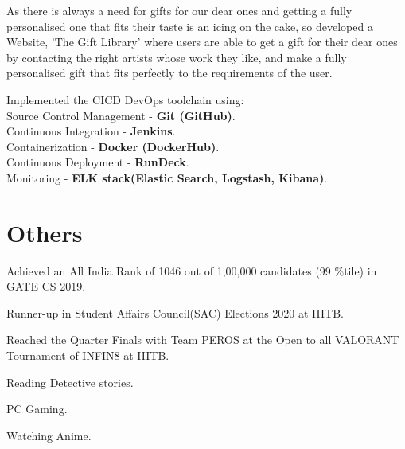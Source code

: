 \documentclass[]{deedy-resume-openfont}
\begin{document}
\begin{minipage}[t]{0.66\textwidth}
\begin{tightemize}
\item As there is always a need for gifts for our dear ones and getting a fully personalised one that fits their taste is an icing on the cake, so developed a Website, 'The Gift Library' where users are able to get a gift for their dear ones by contacting the right artists whose work they like, and make a fully personalised gift that fits perfectly to the requirements of the user.
\item Implemented the CICD DevOps toolchain using: \\
Source Control Management - \textbf{Git (GitHub)}.\\
Continuous Integration - \textbf{Jenkins}.\\
Containerization - \textbf{Docker (DockerHub)}.\\
Continuous Deployment - \textbf{RunDeck}.\\
Monitoring - \textbf{ELK stack(Elastic Search, Logstash, Kibana)}.
\end{tightemize}
\sectionsep


\section{Others} 

\begin{tightemize}
\item Achieved an All India Rank of 1046 out of 1,00,000 candidates (99 \%tile) in 
GATE CS 2019.
\item Runner-up in Student Affairs Council(SAC) Elections 2020 at IIITB.
\item Reached the Quarter Finals with Team PEROS at the Open to all VALORANT Tournament of INFIN8 at IIITB.
\end{tightemize}

\begin{tightemize}
\item Reading Detective stories.
\item PC Gaming.
\item Watching Anime.
\end{tightemize}

\end{minipage} 
\end{document}

